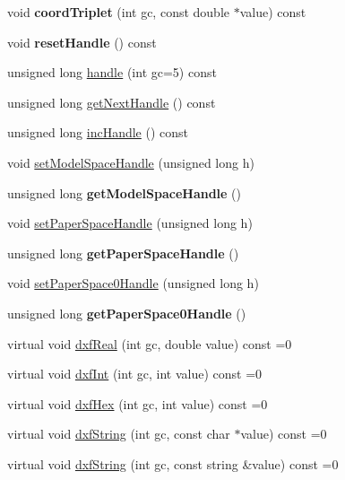 \begin{DoxyCompactItemize}
\item 
\hypertarget{classDL__Writer_a14440aeb254928982e70d912c4948fcb}{void {\bfseries coord\-Triplet} (int gc, const double $\ast$value) const }\label{classDL__Writer_a14440aeb254928982e70d912c4948fcb}

\item 
\hypertarget{classDL__Writer_a7f76a8b5c30d3173643027b2e9f1f6af}{void {\bfseries reset\-Handle} () const }\label{classDL__Writer_a7f76a8b5c30d3173643027b2e9f1f6af}

\item 
unsigned long \hyperlink{classDL__Writer_a17193a6cbff6d33d64690cd39c91cdcb}{handle} (int gc=5) const 
\item 
unsigned long \hyperlink{classDL__Writer_a7adcf7edb2df6c065d07d44db7232e76}{get\-Next\-Handle} () const 
\item 
unsigned long \hyperlink{classDL__Writer_a1578d66c34ea3aa73858b9accfdc638c}{inc\-Handle} () const 
\item 
void \hyperlink{classDL__Writer_a1a302dd063f545d13f109bea9ad4736a}{set\-Model\-Space\-Handle} (unsigned long h)
\item 
\hypertarget{classDL__Writer_abfba18d04cdc612fb789e8d81fd7961d}{unsigned long {\bfseries get\-Model\-Space\-Handle} ()}\label{classDL__Writer_abfba18d04cdc612fb789e8d81fd7961d}

\item 
void \hyperlink{classDL__Writer_ae512e207d4f63a94f3cacd3604cf4cb5}{set\-Paper\-Space\-Handle} (unsigned long h)
\item 
\hypertarget{classDL__Writer_a4a189925ff5fbdb4698670a1d5d14ee4}{unsigned long {\bfseries get\-Paper\-Space\-Handle} ()}\label{classDL__Writer_a4a189925ff5fbdb4698670a1d5d14ee4}

\item 
void \hyperlink{classDL__Writer_a0da45195b1ee57fb5315e4d1ba20c8a2}{set\-Paper\-Space0\-Handle} (unsigned long h)
\item 
\hypertarget{classDL__Writer_a2a13f33078096e1d2de2520068f36fae}{unsigned long {\bfseries get\-Paper\-Space0\-Handle} ()}\label{classDL__Writer_a2a13f33078096e1d2de2520068f36fae}

\item 
virtual void \hyperlink{classDL__Writer_a36f163a34cb91e63dcc5ff412f7981d0}{dxf\-Real} (int gc, double value) const =0
\item 
virtual void \hyperlink{classDL__Writer_a038b715457b6c1b15183e14e1bca5ced}{dxf\-Int} (int gc, int value) const =0
\item 
virtual void \hyperlink{classDL__Writer_ab3efae31c835548d5266aa72cc8b25e4}{dxf\-Hex} (int gc, int value) const =0
\item 
virtual void \hyperlink{classDL__Writer_a06a4aa2b632a66800defb87794d13896}{dxf\-String} (int gc, const char $\ast$value) const =0
\item 
virtual void \hyperlink{classDL__Writer_a18e79d9a34b2c3680f07d9c7bdcbd6a1}{dxf\-String} (int gc, const string \&value) const =0
\end{DoxyCompactItemize}
